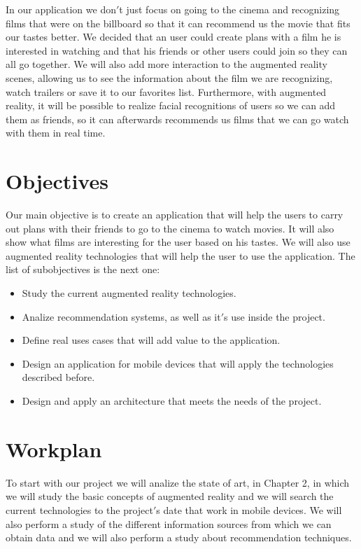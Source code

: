 In our application we don$'$t just focus on going to the cinema and recognizing films that were 
on the billboard so that it can recommend us the movie that fits our tastes better. We decided that an user
could create plans with a film he is interested in watching and that his friends or other users could join so they can
all go together. We will also add more interaction to the augmented reality scenes, allowing us to see the information about
the film we are recognizing, watch trailers or save it to our favorites list. Furthermore, with augmented
reality, it will be possible to realize facial recognitions of users so we can add them as friends, so it can afterwards recommends us
films that we can go watch with them in real time.

\section{Objectives}

Our main objective is to create an application that will help the users to carry out plans with their friends to go
to the cinema to watch movies. It will also show what films are interesting for the user based on his tastes. We will also use
augmented reality technologies that will help the user to use the application. The list of subobjectives is the next one:

\begin{itemize}
    \item Study the current augmented reality technologies.
    \item Analize recommendation systems, as well as it$'$s use inside the project.
    \item Define real uses cases that will add value to the application.
    \item Design an application for mobile devices that will apply the technologies described before.
    \item Design and apply an architecture that meets the needs of the project.
\end{itemize}

\section{Workplan}

To start with our project we will analize the state of art, in Chapter 2, in which we will
study the basic concepts of augmented reality and we will search the current technologies to the project$'$s date that
work in mobile devices. We will also perform a study of the different information sources from which we can obtain data and we will
also perform a study about recommendation techniques.

